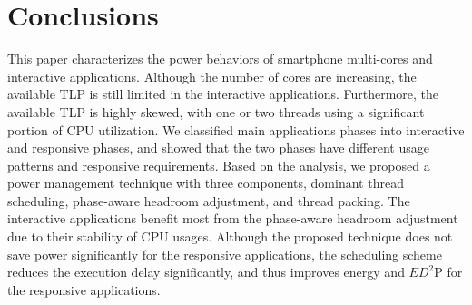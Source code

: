\chapter{Conclusions}

This paper characterizes the power behaviors of smartphone multi-cores and interactive applications. 
Although the number of cores are increasing, the available TLP is still limited in the interactive
applications. Furthermore, the available TLP is highly skewed, with one or two threads using
a significant portion of CPU utilization. We classified main applications phases into
interactive and responsive phases, and showed that the two phases have different usage patterns
and responsive requirements.
Based on the analysis, we proposed a power management technique with three components,
dominant thread scheduling, phase-aware headroom adjustment, and thread packing. The interactive
applications benefit most from the phase-aware headroom adjustment due to their stability
of CPU usages. Although the proposed technique does not save power significantly for
the responsive applications, the scheduling scheme reduces the execution delay significantly,
and thus improves energy and $ED^2$P for the responsive applications. 



